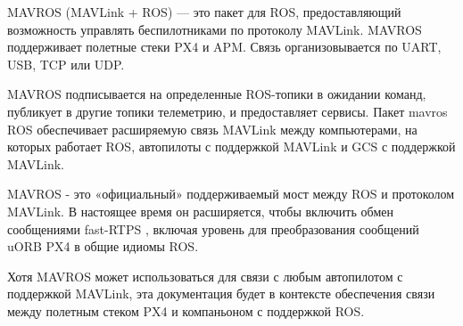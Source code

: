 MAVROS (MAVLink + ROS) — это пакет для ROS, предоставляющий возможность управлять беспилотниками по протоколу MAVLink. MAVROS поддерживает полетные стеки PX4 и APM. Связь организовывается по UART, USB, TCP или UDP.

MAVROS подписывается на определенные ROS-топики в ожидании команд, публикует в другие топики телеметрию, и предоставляет сервисы.
Пакет mavros ROS обеспечивает расширяемую связь MAVLink между компьютерами, на которых работает ROS, автопилоты с поддержкой MAVLink и GCS с поддержкой MAVLink.

MAVROS - это «официальный» поддерживаемый мост между ROS и протоколом MAVLink. В настоящее время он расширяется, чтобы включить обмен сообщениями fast-RTPS , включая уровень для преобразования сообщений uORB PX4 в общие идиомы ROS.

Хотя MAVROS может использоваться для связи с любым автопилотом с поддержкой MAVLink, эта документация будет в контексте обеспечения связи между полетным стеком PX4 и компаньоном с поддержкой ROS.
